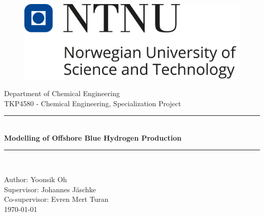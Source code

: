 \begin{titlepage}

\newcommand{\HRule}{\rule{\linewidth}{0.5mm}} %

\center %
\begin{figure}[htp]
    \centering
    \includegraphics[scale=0.7]{Figure/ntnu_logo.png}
\end{figure} %
\vspace{0.5cm}

{\LARGE Department of Chemical Engineering}\\
\vspace{0.5cm}
{\LARGE TKP4580 - Chemical Engineering, Specialization Project }\vspace{1cm}\\

\HRule \\[0.4cm]
{\Huge \textbf{Modelling of Offshore Blue Hydrogen Production}} 
\HRule \\[0.4cm]
\vspace{1cm}

{\Large Author: Yoonsik Oh}\vspace{0.5cm}\\ 
{\Large Supervisor: Johannes Jäschke}\vspace{0.5cm}\\
{\Large Co-supervisor: Evren Mert Turan} \vspace{0.5cm} \\
\vfill
{\large \today}\\[3cm]
\end{titlepage} 